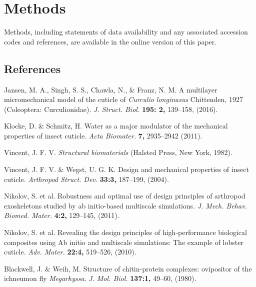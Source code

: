 \documentclass[twocolumn, linenumbers, superscriptaddress]{revtex4-1}
\begin{document}
	\section{Methods}
		Methods, including statements of data availability and any associated accession codes and references, are available in the online version of this paper.
	
	\begin{thebibliography}{50}
		\section*{References}
				Jansen, M. A., Singh, S. S., Chawla, N., \& Franz, N. M.
				A multilayer micromechanical model of the cuticle of \textit{Curculio longinasus} Chittenden, 1927 (Coleoptera: Curculionidae).
				\textit{J. Struct. Biol.}
				\textbf{195: 2,}
				139--158,
				(2016).
				
				Klocke, D. \& Schmitz, H.
				Water as a major modulator of the mechanical properties of insect cuticle.
				\textit{Acta Biomater.}
				\textbf{7,}
				2935--2942
				(2011).
				
				Vincent, J. F. V.
				\textit{Structural biomaterials}
				(Halsted Press,
				New York,
				1982).
				
				Vincent, J. F. V. \& Wegst, U. G. K.
				Design and mechanical properties of insect cuticle.				
				\textit{Arthropod Struct. Dev.}
				\textbf{33:3,}
				187--199,
				(2004).
				
				Nikolov, S. et al.
				Robustness and optimal use of design principles of arthropod exoskeletons studied by ab initio-based multiscale simulations.
				\textit{J. Mech. Behav. Biomed. Mater.}
				\textbf{4:2,}
				129--145,
				(2011).
				
				Nikolov, S. et al.
				Revealing the design principles of high-performance biological composites using Ab initio and multiscale simulations: The example of lobster cuticle.
				\textit{Adv. Mater.}
				\textbf{22:4,}
				519--526,
				(2010).
				
				Blackwell, J. \& Weih, M.
				Structure of chitin-protein complexes: ovipositor of the ichneumon fly \textit{Megarhyssa}.
				\textit{J. Mol. Biol.}
				\textbf{137:1,}
				49--60,
				(1980).


\end{thebibliography}
\end{document}

